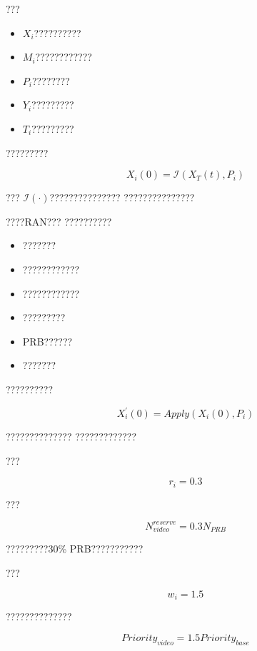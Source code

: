 ???

\begin{itemize}
    \item $X_i$??????????
    \item $M_i$????????????
    \item $P_i$????????
    \item $Y_i$?????????
    \item $T_i$?????????
\end{itemize}


?????????

\begin{equation}
X_i(0)
=
\mathcal{I}
(
X_T(t),
P_i
)
\end{equation}

???
$\mathcal{I}(\cdot)$???????????????
???????????????


????RAN???
??????????

\begin{itemize}
    \item ???????
    \item ????????????
    \item ????????????
    \item ?????????
    \item PRB??????
    \item ???????
\end{itemize}


??????????

\begin{equation}
X_i^{'}(0)
=
Apply
(
X_i(0),
P_i
)
\end{equation}

??????????????
?????????????


???

\begin{equation}
r_i=0.3
\end{equation}

???

\begin{equation}
N_{video}^{reserve}
=
0.3N_{PRB}
\end{equation}

?????????30\% PRB???????????


???

\begin{equation}
w_i=1.5
\end{equation}

??????????????

\begin{equation}
Priority_{video}
=
1.5
Priority_{base}
\end{equation}


